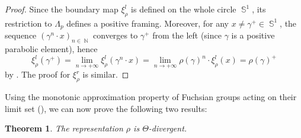 \documentclass{amsart}
\theoremstyle{plain}
\newtheorem{theorem}[proposition]{Theorem}
\theoremstyle{definition}
\DeclareMathOperator{\Nb}{{\mathbb{N}}}
\DeclareMathOperator{\Sb}{\mathbb{S}}
\newcommand{\1}{\mathbf{1}}
\begin{document}
\begin{proof}
    Since the boundary map $\xi^l_\rho$ is defined on the whole circle $\Sb^1$, its restriction to $\Lambda_p$ defines a positive framing. Moreover, for any $x\neq \gamma^+ \in \Sb^1$, the sequence $(\gamma^n\cdot x)_{n\in \Nb}$ converges to $\gamma^+$ from the left (since $\gamma$ is a positive parabolic element), hence
    \[\xi_\rho^l(\gamma^+) = \lim_{n\to +\infty}\xi_\rho^l(\gamma^n\cdot x) = \lim_{n\to +\infty} \rho(\gamma)^n \cdot \xi_\rho^l(x) = \rho(\gamma)^+\]
    by . The proof for $\xi_\rho^r$ is similar.
\end{proof}




Using the monotonic approximation property of Fuchsian groups acting on their limit set (), we can now prove the following two results:

\begin{theorem}
\label{thm: positive rep are divergent}
    The representation $\rho$ is $\Theta$-divergent.
\end{theorem}
\end{document}

